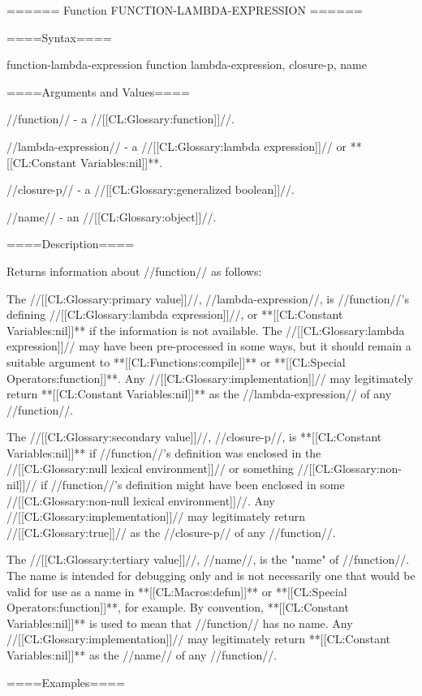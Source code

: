 ====== Function FUNCTION-LAMBDA-EXPRESSION ======

====Syntax====

\DefunWithValuesNewline function-lambda-expression {function} {lambda-expression, closure-p, name}

====Arguments and Values====

//function// - a //[[CL:Glossary:function]]//.

//lambda-expression// - a //[[CL:Glossary:lambda expression]]// or **[[CL:Constant Variables:nil]]**.

//closure-p// - a //[[CL:Glossary:generalized boolean]]//.

//name// - an //[[CL:Glossary:object]]//.

====Description====

Returns information about //function// as follows:

The //[[CL:Glossary:primary value]]//, //lambda-expression//, is //function//'s defining //[[CL:Glossary:lambda expression]]//, or **[[CL:Constant Variables:nil]]** if the information is not available. The //[[CL:Glossary:lambda expression]]// may have been pre-processed in some ways, but it should remain a suitable argument to **[[CL:Functions:compile]]** or **[[CL:Special Operators:function]]**. Any //[[CL:Glossary:implementation]]// may legitimately return **[[CL:Constant Variables:nil]]** as the //lambda-expression// of any //function//.

The //[[CL:Glossary:secondary value]]//, //closure-p//, is **[[CL:Constant Variables:nil]]** if //function//'s definition was enclosed in the //[[CL:Glossary:null lexical environment]]// or something //[[CL:Glossary:non-nil]]// if //function//'s definition might have been enclosed in some //[[CL:Glossary:non-null lexical environment]]//. Any //[[CL:Glossary:implementation]]// may legitimately return //[[CL:Glossary:true]]// as the //closure-p// of any //function//.

The //[[CL:Glossary:tertiary value]]//, //name//, is the "name" of //function//. The name is intended for debugging only and is not necessarily one that would be valid for use as a name in **[[CL:Macros:defun]]** or **[[CL:Special Operators:function]]**, for example. By convention, **[[CL:Constant Variables:nil]]** is used to mean that //function// has no name. Any //[[CL:Glossary:implementation]]// may legitimately return **[[CL:Constant Variables:nil]]** as the //name// of any //function//.


====Examples====

